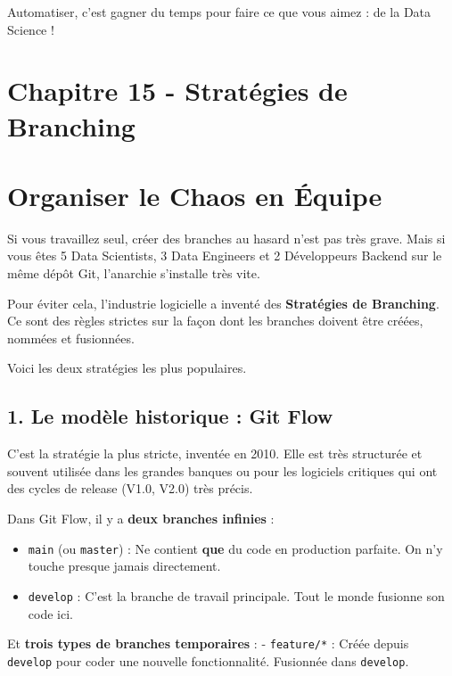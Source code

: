 \documentclass[
  letterpaper,
  DIV=11,
  numbers=noendperiod]{scrreprt}
\begin{document}
Automatiser, c'est gagner du temps pour faire ce que vous aimez : de la
Data Science !


\section{Chapitre 15 - Stratégies de
Branching}\label{chapitre-15---stratuxe9gies-de-branching}


\section{Organiser le Chaos en
Équipe}\label{organiser-le-chaos-en-uxe9quipe}

Si vous travaillez seul, créer des branches au hasard n'est pas très
grave. Mais si vous êtes 5 Data Scientists, 3 Data Engineers et 2
Développeurs Backend sur le même dépôt Git, l'anarchie s'installe très
vite.

Pour éviter cela, l'industrie logicielle a inventé des
\textbf{Stratégies de Branching}. Ce sont des règles strictes sur la
façon dont les branches doivent être créées, nommées et fusionnées.

Voici les deux stratégies les plus populaires.

\subsection{1. Le modèle historique : Git
Flow}\label{le-moduxe8le-historique-git-flow}

C'est la stratégie la plus stricte, inventée en 2010. Elle est très
structurée et souvent utilisée dans les grandes banques ou pour les
logiciels critiques qui ont des cycles de release (V1.0, V2.0) très
précis.

Dans Git Flow, il y a \textbf{deux branches infinies} :

\begin{itemize}
\item
  \texttt{main} (ou \texttt{master}) : Ne contient \textbf{que} du code
  en production parfaite. On n'y touche presque jamais directement.
\item
  \texttt{develop} : C'est la branche de travail principale. Tout le
  monde fusionne son code ici.
\end{itemize}

Et \textbf{trois types de branches temporaires} : - \texttt{feature/*} :
Créée depuis \texttt{develop} pour coder une nouvelle fonctionnalité.
Fusionnée dans \texttt{develop}.
\end{document}
